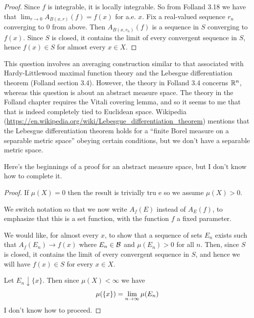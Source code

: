 \begin{proof}
  Since $f$ is integrable, it is locally integrable. So from Folland 3.18 we have
  that $\lim_{r \to 0} A_{B(x, r)}(f) = f(x)$ for a.e. $x$. Fix a real-valued sequence $r_n$ converging
  to $0$ from above. Then $A_{B(x, r_n)}(f)$ is a sequence in $S$ converging to $f(x)$. Since $S$
  is closed, it contains the limit of every convergent sequence in $S$, hence $f(x) \in S$ for
  almost every $x \in X$.
\end{proof}

\begin{remark*}
  This question involves an averaging construction similar to that associated with Hardy-Littlewood
  maximal function theory and the Lebesgue differentiation theorem (Folland section 3.4). However,
  the theory in Folland 3.4 concerns $\mathbb{R}^n$, whereas this question is about an abstract measure
  space. The theory in the Folland chapter requires the Vitali covering lemma, and so it seems to
  me that that is indeed completely tied to Euclidean space. Wikipedia
  (\url{https://en.wikipedia.org/wiki/Lebesgue_differentiation_theorem}) mentions that the Lebesgue differentiation theorem holds for
  a ``finite Borel measure on a separable metric space​'' obeying certain conditions, but we don't
  have a separable metric space.
\end{remark*}

Here's the beginnings of a proof for an abstract measure space, but I don't know how to complete
it.

\begin{proof}
  If $\mu(X) = 0$ then the result is trivially tru e so we assume $\mu(X) > 0$.

  We switch notation so that we now write $A_f(E)$ instead of $A_E(f)$, to emphasize that this is a
  set function, with the function $f$ a fixed parameter.

  We would like, for almost every $x$, to show that a sequence of sets $E_n$ exists such
  that $A_f(E_n) \to f(x)$ where $E_n \in \mathcal B$ and $\mu(E_n) > 0$ for all $n$. Then, since $S$ is
  closed, it contains the limit of every convergent sequence in $S$, and hence we will
  have $f(x) \in S$ for every $x \in X$.

  Let $E_n \downarrow \{x\}$. Then since $\mu(X) < \infty$ we have
  \begin{align*}
    \mu(\{x\}) = \limninf \mu(E_n)
  \end{align*}
  I don't know how to proceed.
\end{proof}

